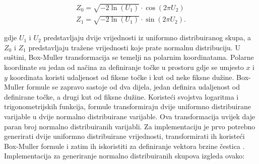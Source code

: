 \documentclass{foi}
\begin{document}
 \begin{align*}
Z_0 = \sqrt{-2 \ln(U_1)} \cdot \cos(2 \pi U_2)
\\
Z_1 = \sqrt{-2 \ln(U_1)} \cdot \sin(2 \pi U_2).
\end{align*}

gdje $U_1$ i $U_2$ predstavljaju dvije vrijednosti iz uniformno distribuiranog skupa, a $Z_0$ i $Z_1$ predstavljaju tražene vrijednosti koje prate normalnu distribuciju. U suštini, Box-Muller transformacija se temelji na polarnim koordinatama. Polarne koordinate su jedan od načina za definiranje točke u prostoru gdje se umjesto $x$ i $y$ koordinata koristi udaljenost od fiksne točke i kut od neke fiksne dužine. Box-Muller formule se zapravo sastoje od dva dijela, jedan definira udaljenost od definirane točke, a drugi kut od fiksne dužine. Koristeći svojstva logaritma i trigonometrijskih funkcija, formule transformiraju dvije uniformno distribuirane varijable u dvije normalno distribuirane varijable. Ova transformacija uvijek daje paran broj normalno distribuiranih varijabli. Za implementaciju je prvo potrebno generirati dvije uniformno distribuirane vrijednosti, transformirati ih koristeći Box-Muller formule i zatim ih iskoristiti za definiranje vektora brzine čestica \parencite{BoxMullerBezDat}. Implementacija za generiranje normalno distribuiranih skupova izgleda ovako:
\end{document}
